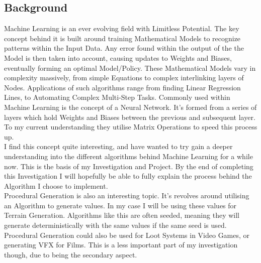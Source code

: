\begin{flushleft}
        \subsection{Background}
            \vspace{0.2cm}
            Machine Learning is an ever evolving field with Limitless Potential. The key concept behind it is built around training
            Mathematical Models to recognize patterns within the Input Data. Any error found within the output of the the Model is then
            taken into account, causing updates to Weights and Biases, eventually forming an optimal Model/Policy. These Mathematical 
            Models vary in complexity massively, from simple Equations to complex interlinking layers of Nodes. Applications of such 
            algorithms range from finding Linear Regression Lines, to Automating Complex Multi-Step Tasks. Commonly used within Machine 
            Learning is the concept of a Neural Network. It's formed from a series of layers which hold Weights and Biases between the 
            previous and subsequent layer. To my current understanding they utilise Matrix Operations to speed this process up. \\
            \vspace{0.2cm}
            I find this concept quite interesting, and have wanted to try gain a deeper understanding into the different 
            algorithms behind Machine Learning for a while now. This is the basis of my Investigation and Project. By the end
            of completing this Investigation I will hopefully be able to fully explain the process behind the Algorithm I choose
            to implement. \\
            \vspace{0.2cm}
            Procedural Generation is also an interesting topic. It's revolves around utilising an Algorithm to generate values. In my 
            case I will be using these values for Terrain Generation. Algorithms like this are often seeded, meaning they will generate 
            deterministically with the same values if the same seed is used. Procedural Generation could also be used for Loot Systems
            in Video Games, or generating VFX for Films. This is a less important part of my investigation though, due to being
            the secondary aspect.
            \vspace{0.2cm}

\end{flushleft}
